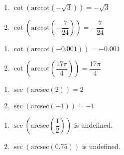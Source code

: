 \documentclass{ximera}
\begin{document}
\begin{multicols}{2}

\begin{enumerate}

\setcounter{enumi}{\value{HW}}

\item $\cot\left(\text{arccot}\left(-\sqrt{3}\right)\right) = -\sqrt{3}$ 
\item $\cot\left(\text{arccot}\left(-\dfrac{7}{24}\right)\right) = -\dfrac{7}{24}$

\setcounter{HW}{\value{enumi}}

\end{enumerate}

\end{multicols}

\begin{multicols}{2}

\begin{enumerate}

\setcounter{enumi}{\value{HW}}

\item $\cot\left(\text{arccot}\left(-0.001\right)\right) = -0.001$ 
\item $\cot\left(\text{arccot}\left( \dfrac{17\pi}{4} \right)\right) = \dfrac{17\pi}{4}$

\setcounter{HW}{\value{enumi}}

\end{enumerate}

\end{multicols}

\begin{multicols}{2}

\begin{enumerate}

\setcounter{enumi}{\value{HW}}

\item $\sec\left(\text{arcsec}\left(2\right)\right) = 2$
\item $\sec\left(\text{arcsec}\left(-1\right)\right) = -1$

\setcounter{HW}{\value{enumi}}

\end{enumerate}

\end{multicols}

\begin{multicols}{2}

\begin{enumerate}

\setcounter{enumi}{\value{HW}}

\item $\sec\left(\text{arcsec}\left(\dfrac{1}{2}\right)\right)$ is undefined.
\item $\sec\left(\text{arcsec}\left(0.75\right)\right)$ is undefined. 

\setcounter{HW}{\value{enumi}}

\end{enumerate}

\end{multicols}
\end{document}
